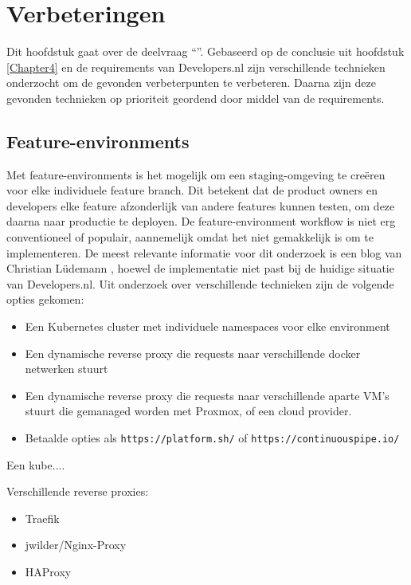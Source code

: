 \chapter{Verbeteringen}

\label{Chapter5}

Dit hoofdstuk gaat over de deelvraag \enquote{\deelverbetering}. Gebaseerd op de conclusie uit hoofdstuk \ref{Chapter4} en de requirements van Developers.nl zijn verschillende technieken onderzocht om de gevonden verbeterpunten te verbeteren. Daarna zijn deze gevonden technieken op prioriteit geordend door middel van de requirements. 

\section{Feature-environments}
Met feature-environments is het mogelijk om een staging-omgeving te creëren voor elke individuele feature branch. Dit betekent dat de product owners en developers elke feature afzonderlijk van andere features kunnen testen, om deze daarna naar productie te deployen. De feature-environment workflow is niet erg conventioneel of populair, aannemelijk omdat het niet gemakkelijk is om te implementeren. De meest relevante informatie voor dit onderzoek is een blog van Christian Lüdemann \parencite{FeatureEnvs}, hoewel de implementatie niet past bij de huidige situatie van Developers.nl. Uit onderzoek over verschillende technieken zijn de volgende opties gekomen:
\begin{itemize}
	\item Een Kubernetes cluster met individuele namespaces voor elke environment
	\item Een dynamische reverse proxy die requests naar verschillende docker netwerken stuurt
	\item Een dynamische reverse proxy die requests naar verschillende aparte VM's stuurt die gemanaged worden met Proxmox, of een cloud provider.
	\item Betaalde opties als \texttt{https://platform.sh/} of \texttt{https://continuouspipe.io/}
\end{itemize}

Een kube....


Verschillende reverse proxies:
\begin{itemize}
	\item Traefik
	\item jwilder/Nginx-Proxy
	\item HAProxy	
\end{itemize}

